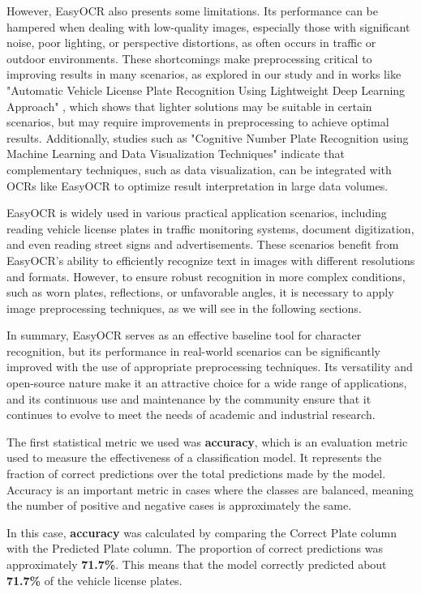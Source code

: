 \documentclass[conference]{IEEEtran}
\begin{document}
	However, EasyOCR also presents some limitations. Its performance can be hampered when dealing with low-quality images, especially those with significant noise, poor lighting, or perspective distortions, as often occurs in traffic or outdoor environments. These shortcomings make preprocessing critical to improving results in many scenarios, as explored in our study and in works like "Automatic Vehicle License Plate Recognition Using Lightweight Deep Learning Approach" \cite{b5}, which shows that lighter solutions may be suitable in certain scenarios, but may require improvements in preprocessing to achieve optimal results. Additionally, studies such as "Cognitive Number Plate Recognition using Machine Learning and Data Visualization Techniques" \cite{b6} indicate that complementary techniques, such as data visualization, can be integrated with OCRs like EasyOCR to optimize result interpretation in large data volumes.
	
	EasyOCR is widely used in various practical application scenarios, including reading vehicle license plates in traffic monitoring systems, document digitization, and even reading street signs and advertisements. These scenarios benefit from EasyOCR's ability to efficiently recognize text in images with different resolutions and formats. However, to ensure robust recognition in more complex conditions, such as worn plates, reflections, or unfavorable angles, it is necessary to apply image preprocessing techniques, as we will see in the following sections.
	
	In summary, EasyOCR serves as an effective baseline tool for character recognition, but its performance in real-world scenarios can be significantly improved with the use of appropriate preprocessing techniques. Its versatility and open-source nature make it an attractive choice for a wide range of applications, and its continuous use and maintenance by the community ensure that it continues to evolve to meet the needs of academic and industrial research.
	
	The first statistical metric we used was \textbf{accuracy}, which is an evaluation metric used to measure the effectiveness of a classification model. It represents the fraction of correct predictions over the total predictions made by the model. Accuracy is an important metric in cases where the classes are balanced, meaning the number of positive and negative cases is approximately the same.
	
	In this case, \textbf{accuracy} was calculated by comparing the Correct Plate column with the Predicted Plate column. The proportion of correct predictions was approximately \textbf{71.7\%}. This means that the model correctly predicted about \textbf{71.7\%} of the vehicle license plates.
	
\end{document}
